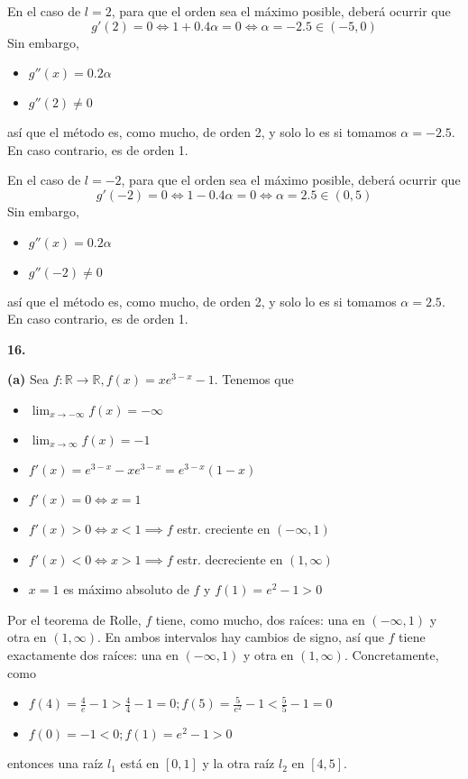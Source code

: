 \documentclass[12pt]{report}
\newcommand{\R}{\mathbb R}
\begin{document}
\vspace{2mm}
En el caso de $l = 2$, para que el orden sea el máximo posible, deberá ocurrir que
\[g'(2) = 0 \iff 1+0.4\alpha = 0 \iff \alpha = -2.5 \in (-5,0)\]
Sin embargo,
\begin{itemize}
    \item $g''(x) = 0.2\alpha$
    \item $g''(2) \neq 0$
\end{itemize}
así que el método es, como mucho, de orden 2, y solo lo es si tomamos $\alpha = -2.5$. En caso contrario, es de orden 1.

\vspace{2mm}
En el caso de $l = -2$, para que el orden sea el máximo posible, deberá ocurrir que
\[g'(-2) = 0 \iff 1-0.4\alpha = 0 \iff \alpha = 2.5 \in (0,5)\]
Sin embargo,
\begin{itemize}
    \item $g''(x) = 0.2\alpha$
    \item $g''(-2) \neq 0$
\end{itemize}
así que el método es, como mucho, de orden 2, y solo lo es si tomamos $\alpha = 2.5$. En caso contrario, es de orden 1.

\vspace{6mm}
\textbf{16. }

\vspace{2mm}
\textbf{(a) } Sea $f \colon \R \to \R, f(x) = xe^{3-x}-1$. Tenemos que
\begin{itemize}
    \item $\displaystyle \lim_{x \to -\infty} f(x) = -\infty$
    \item $\displaystyle \lim_{x \to \infty} f(x) = -1$ 
    \item $f'(x) = e^{3-x} - xe^{3-x} = e^{3-x}(1-x)$
    \item $f'(x) = 0 \iff x = 1$
    \item $f'(x) > 0 \iff x < 1 \implies f$ estr. creciente en $(-\infty,1)$ 
    \item $f'(x) < 0 \iff x > 1 \implies f$ estr. decreciente en $(1,\infty)$ 
    \item $x = 1$ es máximo absoluto de $f$ y $f(1) = e^2 - 1 > 0$
\end{itemize}
Por el teorema de Rolle, $f$ tiene, como mucho, dos raíces: una en $(-\infty,1)$ y otra en $(1,\infty)$. En ambos intervalos hay cambios de signo, así que $f$ tiene exactamente dos raíces: una en $(-\infty,1)$ y otra en $(1,\infty)$. Concretamente, como
\begin{itemize}
    \item $\displaystyle f(4) = \frac{4}{e} - 1 > \frac{4}{4} - 1 = 0; f(5) = \frac{5}{e^2}-1 < \frac{5}{5}-1 = 0$
    \item $f(0) = -1 < 0; f(1) = e^2-1 > 0$
\end{itemize}
entonces una raíz $l_1$ está en $[0,1]$ y la otra raíz $l_2$ en $[4,5]$.
\end{document}
